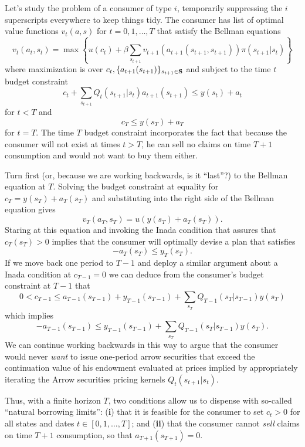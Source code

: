 Let's study the problem of  a consumer of type $i$, temporarily suppressing the $i$ superscripts everywhere 
to keep things tidy.  The consumer has list of optimal value functions $v_t(a, s)$ for $t = 0, 1, \ldots, T$ that satisfy
the Bellman equations
$$ v_t(a_t, s_t) = \max \left\{ u(c_t) + \beta \sum_{s_{t+1}} v_{t+1} (a_{t+1}(s_{t+1}, s_{t+1})) \pi(s_{t+1}|s_t)  \right\}$$
where  maximization is over $c_t, \{a_{t+1}(s_{t+1})\}_{s_{t+1} \in {\bf S}}$ and subject to the time
$t$ budget constraint
$$ c_t + \sum_{s_{t+1}} Q_t(s_{t+1} | s_t) a_{t+1}(s_{t+1}) \leq y(s_t) + a_t  $$
for $t < T$ and
$$ c_T \leq y(s_T) + a_T $$
for $t=T$.  The time $T$ budget constraint incorporates the fact that because the consumer will not exist
at times $t > T$, he can sell no claims on time $T+1$ consumption and would not want to buy them either.

Turn first (or,  because we are working backwards, is it ``last''?) to the Bellman equation at $T$. Solving the budget constraint at equality for $c_T =y(s_T) + a_T(s_T)$ and substituting into the right side of the Bellman equation gives
$$ v_T(a_T, s_T) = u(y(s_T) + a_T(s_T) ). $$
Staring at this equation and invoking the Inada condition that assures that $c_T(s_T) >0$  implies that the consumer
will optimally devise a plan that satisfies
$$ - a_T(s_T) \leq y_T(s_T) .$$
If we move back one period to $T-1$ and deploy  a similar argument about a Inada condition at $c_{T-1} = 0$  we can deduce from the consumer's budget constraint at $T-1$ that
$$ 0 < c_{T-1} \leq a_{T-1}(s_{T-1}) + y_{T-1}(s_{T-1}) + \sum_{s_T} Q_{T-1}(s_T | s_{T-1}) y(s_T) $$
which implies
$$ - a_{T-1}(s_{T-1})  \leq  y_{T-1}(s_{T-1}) + \sum_{s_T} Q_{T-1}(s_T | s_{T-1}) y(s_T) .$$
We can continue working backwards in this way to argue that the consumer would never {\it want\/}
to issue one-period arrow securities that exceed the continuation value of his endowment evaluated at 
prices implied  by  appropriately iterating the Arrow securities pricing kernels $Q_t(s_{t+1}|s_t)$.

Thus, with a finite horizon $T$, two conditions  allow us to dispense with so-called ``natural borrowing limits'':
({\bf i})  that it is feasible for the consumer to set $c_t >0$ for all states and dates $t \in [0, 1, \ldots, T]$;
and ({\bf ii}) that the consumer cannot {\it sell\/} claims on time $T+1$ consumption, so that $a_{T+1}(s_{T+1}) = 0$.

\newpage

\medskip

 
\medskip

